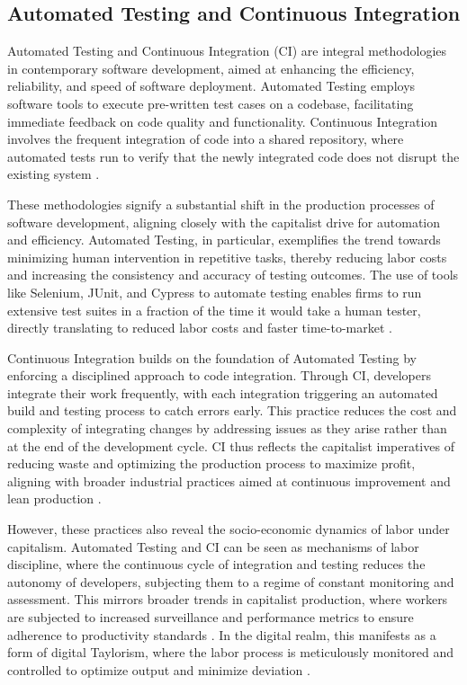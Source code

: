 \begin{refsection}
\subsection{Automated Testing and Continuous Integration}

Automated Testing and Continuous Integration (CI) are integral methodologies in contemporary software development, aimed at enhancing the efficiency, reliability, and speed of software deployment. Automated Testing employs software tools to execute pre-written test cases on a codebase, facilitating immediate feedback on code quality and functionality. Continuous Integration involves the frequent integration of code into a shared repository, where automated tests run to verify that the newly integrated code does not disrupt the existing system \cite[pp.~5-10]{duvall2007continuous}.

These methodologies signify a substantial shift in the production processes of software development, aligning closely with the capitalist drive for automation and efficiency. Automated Testing, in particular, exemplifies the trend towards minimizing human intervention in repetitive tasks, thereby reducing labor costs and increasing the consistency and accuracy of testing outcomes. The use of tools like Selenium, JUnit, and Cypress to automate testing enables firms to run extensive test suites in a fraction of the time it would take a human tester, directly translating to reduced labor costs and faster time-to-market \cite[pp.~102-108]{humble2010continuous}.

Continuous Integration builds on the foundation of Automated Testing by enforcing a disciplined approach to code integration. Through CI, developers integrate their work frequently, with each integration triggering an automated build and testing process to catch errors early. This practice reduces the cost and complexity of integrating changes by addressing issues as they arise rather than at the end of the development cycle. CI thus reflects the capitalist imperatives of reducing waste and optimizing the production process to maximize profit, aligning with broader industrial practices aimed at continuous improvement and lean production \cite[pp.~50-55]{fitzgerald2017continuous}.

However, these practices also reveal the socio-economic dynamics of labor under capitalism. Automated Testing and CI can be seen as mechanisms of labor discipline, where the continuous cycle of integration and testing reduces the autonomy of developers, subjecting them to a regime of constant monitoring and assessment. This mirrors broader trends in capitalist production, where workers are subjected to increased surveillance and performance metrics to ensure adherence to productivity standards \cite[pp.~152-157]{braverman1974labor}. In the digital realm, this manifests as a form of digital Taylorism, where the labor process is meticulously monitored and controlled to optimize output and minimize deviation \cite[pp.~492-497]{marx2008capital}.


\end{refsection}

